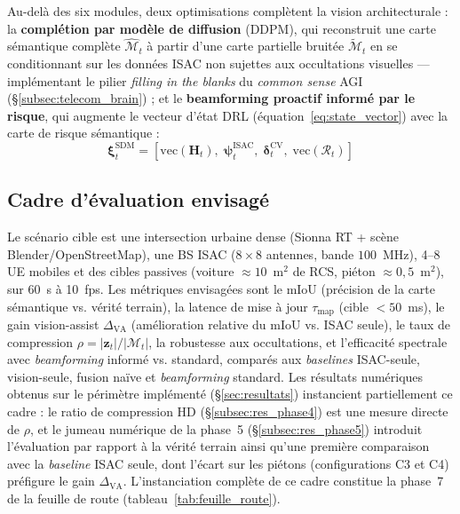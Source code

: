 \documentclass[12pt,a4paper,titlepage]{article}
\begin{document}
Au-delà des six modules, deux optimisations complètent la vision architecturale : la \textbf{complétion par modèle de diffusion} (DDPM), qui reconstruit une carte sémantique complète $\hat{\mathcal{M}}_t$ à partir d'une carte partielle bruitée $\tilde{\mathcal{M}}_t$ en se conditionnant sur les données ISAC non sujettes aux occultations visuelles --- implémentant le pilier \textit{filling in the blanks} du \textit{common sense} AGI (\S\ref{subsec:telecom_brain}) ; et le \textbf{beamforming proactif informé par le risque}, qui augmente le vecteur d'état DRL (équation~\eqref{eq:state_vector}) avec la carte de risque sémantique :
\begin{equation}
    \boldsymbol{\xi}_t^{\text{SDM}} = \left[ \mathrm{vec}(\mathbf{H}_t),\; \boldsymbol{\psi}_t^{\mathrm{ISAC}},\; \boldsymbol{\delta}_t^{\mathrm{CV}},\; \mathrm{vec}(\mathcal{R}_t) \right]
    \label{eq:state_vector_sdm}
\end{equation}

\subsection{Cadre d'évaluation envisagé}
\label{subsec:cadre_evaluation}

Le scénario cible est une intersection urbaine dense (Sionna RT + scène Blender/OpenStreetMap), une BS ISAC ($8\times8$ antennes, bande $100$~MHz), 4--8 UE mobiles et des cibles passives (voiture $\approx10$~m$^2$ de RCS, piéton $\approx0{,}5$~m$^2$), sur 60~s à 10~fps. Les métriques envisagées sont le mIoU (précision de la carte sémantique vs. vérité terrain), la latence de mise à jour $\tau_{\text{map}}$ (cible $<50$~ms), le gain vision-assist $\Delta_{\text{VA}}$ (amélioration relative du mIoU vs. ISAC seule), le taux de compression $\rho = |\mathbf{z}_t|/|\mathcal{M}_t|$, la robustesse aux occultations, et l'efficacité spectrale avec \textit{beamforming} informé vs. standard, comparés aux \textit{baselines} ISAC-seule, vision-seule, fusion naïve et \textit{beamforming} standard. Les résultats numériques obtenus sur le périmètre implémenté (\S\ref{sec:resultats}) instancient partiellement ce cadre : le ratio de compression HD (\S\ref{subsec:res_phase4}) est une mesure directe de $\rho$, et le jumeau numérique de la phase~5 (\S\ref{subsec:res_phase5}) introduit l'évaluation par rapport à la vérité terrain ainsi qu'une première comparaison avec la \textit{baseline} ISAC seule, dont l'écart sur les piétons (configurations C3 et C4) préfigure le gain $\Delta_{\text{VA}}$. L'instanciation complète de ce cadre constitue la phase~7 de la feuille de route (tableau~\ref{tab:feuille_route}).
\end{document}
